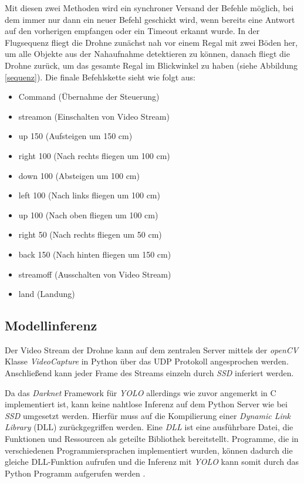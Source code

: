 Mit diesen zwei Methoden wird ein synchroner Versand der Befehle möglich, bei dem immer nur dann ein neuer Befehl geschickt wird, wenn bereits eine Antwort auf den vorherigen empfangen oder ein Timeout erkannt wurde. In der Flugsequenz fliegt die Drohne zunächst nah vor einem Regal mit zwei Böden her, um alle Objekte aus der Nahaufnahme detektieren zu können, danach fliegt die Drohne zurück, um das gesamte Regal im Blickwinkel zu haben (siehe Abbildung \ref{sequenz}). Die finale Befehlskette sieht wie folgt aus:

\begin{itemize}
	\item Command (Übernahme der Steuerung)
	\item streamon (Einschalten von Video Stream)
	\item up 150 (Aufsteigen um 150 cm)
	\item right 100 (Nach rechts fliegen um 100 cm)
	\item down 100 (Absteigen um 100 cm)
	\item left 100 (Nach links fliegen um 100 cm)
	\item up 100 (Nach oben fliegen um 100 cm)
	\item right 50 (Nach rechts fliegen um 50 cm)
	\item back 150 (Nach hinten fliegen um 150 cm)
	\item streamoff (Ausschalten von Video Stream)
	\item land (Landung)
\end{itemize}

\subsection*{Modellinferenz}

Der Video Stream der Drohne kann auf dem zentralen Server mittels der \textit{openCV} Klasse \textit{VideoCapture} in Python über das UDP Protokoll angesprochen werden. Anschließend kann jeder Frame des Streams einzeln durch \textit{SSD} inferiert werden.

Da das \textit{Darknet} Framework für \textit{YOLO} allerdings wie zuvor angemerkt in C implementiert ist, kann keine nahtlose Inferenz auf dem Python Server wie bei \textit{SSD} umgesetzt werden. Hierfür muss auf die Kompilierung einer \textit{Dynamic Link Library} (DLL) zurückgegriffen werden. Eine \textit{DLL} ist eine ausführbare Datei, die Funktionen und Ressourcen als geteilte Bibliothek bereitstellt. Programme, die in verschiedenen Programmiersprachen implementiert wurden, können dadurch die gleiche DLL-Funktion aufrufen und die Inferenz mit \textit{YOLO} kann somit durch das Python Programm aufgerufen werden \cite{MicrosoftCorporation.27.01.2020}.
